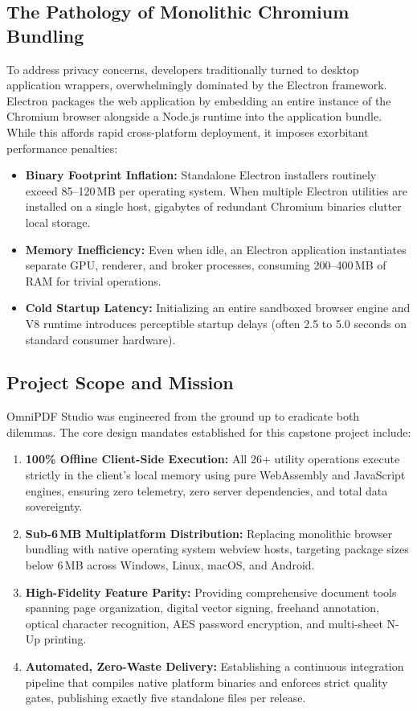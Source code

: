 \documentclass[11pt,a4paper]{article}
\begin{document}
\subsection{The Pathology of Monolithic Chromium Bundling}
To address privacy concerns, developers traditionally turned to desktop application wrappers, overwhelmingly dominated by the Electron framework. Electron packages the web application by embedding an entire instance of the Chromium browser alongside a Node.js runtime into the application bundle. While this affords rapid cross-platform deployment, it imposes exorbitant performance penalties:
\begin{itemize}
    \item \textbf{Binary Footprint Inflation:} Standalone Electron installers routinely exceed 85--120\,MB per operating system. When multiple Electron utilities are installed on a single host, gigabytes of redundant Chromium binaries clutter local storage.
    \item \textbf{Memory Inefficiency:} Even when idle, an Electron application instantiates separate GPU, renderer, and broker processes, consuming 200--400\,MB of RAM for trivial operations.
    \item \textbf{Cold Startup Latency:} Initializing an entire sandboxed browser engine and V8 runtime introduces perceptible startup delays (often 2.5 to 5.0 seconds on standard consumer hardware).
\end{itemize}

\subsection{Project Scope and Mission}
OmniPDF Studio was engineered from the ground up to eradicate both dilemmas. The core design mandates established for this capstone project include:
\begin{enumerate}
    \item \textbf{100\% Offline Client-Side Execution:} All 26+ utility operations execute strictly in the client's local memory using pure WebAssembly and JavaScript engines, ensuring zero telemetry, zero server dependencies, and total data sovereignty.
    \item \textbf{Sub-6\,MB Multiplatform Distribution:} Replacing monolithic browser bundling with native operating system webview hosts, targeting package sizes below 6\,MB across Windows, Linux, macOS, and Android.
    \item \textbf{High-Fidelity Feature Parity:} Providing comprehensive document tools spanning page organization, digital vector signing, freehand annotation, optical character recognition, AES password encryption, and multi-sheet N-Up printing.
    \item \textbf{Automated, Zero-Waste Delivery:} Establishing a continuous integration pipeline that compiles native platform binaries and enforces strict quality gates, publishing exactly five standalone files per release.
\end{enumerate}
\end{document}
